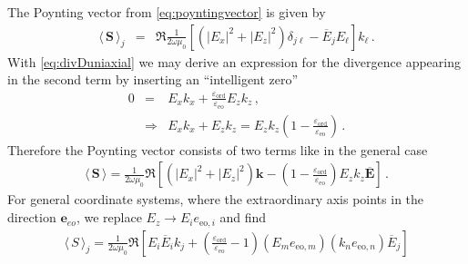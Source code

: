 \documentclass[12pt,a4paper,twoside,openright,BCOR10mm,headsepline,titlepage,abstracton,chapterprefix,final]{scrreprt}
\newcommand\Vector[1]{{\mathbf{#1}}}
\newcommand\vacuum{0}
\newcommand\wavenumber{k}
\newcommand\Wavevector{\Vector{\wavenumber}}
\newcommand\scalarEfield{E}
\newcommand\Efield{\Vector{\scalarEfield}}
\newcommand\vacuumpermeability{\scalarpermeability_{\vacuum}}
\newcommand\scalarpermeability{\mu}
\newcommand\scalarpermittivity{\varepsilon}
\newcommand\ordi{\text{ord}}
\newcommand\eo{\text{eo}}
\newcommand{\timeavg}[1]{{\langle\,#1\,\rangle}}
\begin{document}
The Poynting vector from \eqref{eq:poyntingvector} is given by
\begin{eqnarray}
 \timeavg{\Vector{S}}_j &=&  \Re\frac{1}{2 \omega \vacuumpermeability}\left[ (|\scalarEfield_x|^2 + |\scalarEfield_z|^2) \delta_{j\ell}  - \overline{\scalarEfield}_j \scalarEfield_\ell \right] k_\ell\,.
\end{eqnarray}
With \eqref{eq:divDuniaxial} we may derive an expression for the divergence appearing in the second term by inserting an ``intelligent zero''
\begin{eqnarray}
 0 &=& \scalarEfield_x \wavenumber_x + \frac{\scalarpermittivity_{\ordi}}{\scalarpermittivity_\eo} \scalarEfield_z \wavenumber_z\,,\nonumber\\
&\Rightarrow& \scalarEfield_x \wavenumber_x + \scalarEfield_z \wavenumber_z = \scalarEfield_z \wavenumber_z \left(1 - \frac{\scalarpermittivity_{\ordi}}{\scalarpermittivity_\eo}\right)\,. \label{eq:divEviolation}
\end{eqnarray}
Therefore the Poynting vector consists of two terms like in the general case
\begin{eqnarray}
  \timeavg{\Vector{S}} = \frac{ 1 }{ 2\omega\vacuumpermeability } \Re 
  \left[
      (|\scalarEfield_x|^2 + |\scalarEfield_z|^2)\Wavevector
      - \left(1 - \frac{\scalarpermittivity_{\ordi}}{\scalarpermittivity_\eo}\right)\scalarEfield_z \wavenumber_z \overline{\Efield}
  \right]\,.\label{eq:Suniaxialeo}
\end{eqnarray}
For general coordinate systems, where the extraordinary axis points in the direction $\Vector{e}_{eo}$, 
we replace $E_z \rightarrow E_i e_{\eo, i}$ and find
\begin{eqnarray}
  \timeavg{S}_j = \frac{ 1 }{ 2\omega\vacuumpermeability } \Re 
  \left[
      \scalarEfield_i \overline{\scalarEfield}_i \wavenumber_j
      + \left(\frac{\scalarpermittivity_{\ordi}}{\scalarpermittivity_\eo} - 1\right)
        (\scalarEfield_m e_{\eo,m}) (\wavenumber_n e_{\eo,n}) \overline{\scalarEfield}_j
  \right]
\end{eqnarray}
\end{document}
